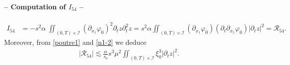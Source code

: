 \documentclass[a4paper, 12pt]{article}
\theoremstyle{plain}
\theoremstyle{definition}
\numberwithin{theorem}{section}
\numberwithin{equation}{section}
\begin{document}
{\paragraph{-- Computation of $I_{54}$ --}
\begin{align*}
I_{54}&=-s^2\alpha~\iint_{(0,T)\times\mathcal{I}}(\partial_{x_1}\varphi_0)^2\partial_tz\partial^2_tz=s^2\alpha\iint_{(0,T)\times\mathcal{I}}(\partial_{x_1}\varphi_0)(\partial_t\partial_{x_1}\varphi_0)|\partial_tz|^2=\mathcal{R}_{54}.
\end{align*}
Moreover, from \eqref{poutre1} and \eqref{n1-2} we deduce
\begin{align}
|\mathcal{R}_{54}| \lesssim \frac{\alpha}{s_0}s^3\mu^2\iint_{(0,T)\times\mathcal{I}}\xi_0^3|\partial_tz|^2.\label{EstR54}
\end{align}
}
\end{document}
